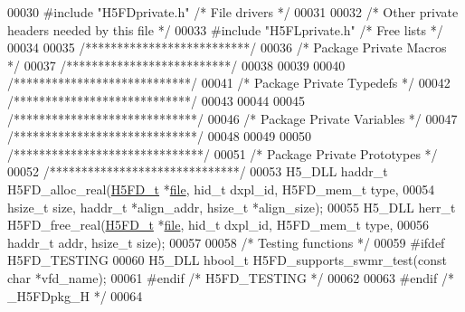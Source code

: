 \begin{DoxyCode}
00030 \textcolor{preprocessor}{#include "H5FDprivate.h"}    \textcolor{comment}{/* File drivers             */}
00031 
00032 \textcolor{comment}{/* Other private headers needed by this file */}
00033 \textcolor{preprocessor}{#include "H5FLprivate.h"}    \textcolor{comment}{/* Free lists                           */}
00034 
00035 \textcolor{comment}{/**************************/}
00036 \textcolor{comment}{/* Package Private Macros */}
00037 \textcolor{comment}{/**************************/}
00038 
00039 
00040 \textcolor{comment}{/****************************/}
00041 \textcolor{comment}{/* Package Private Typedefs */}
00042 \textcolor{comment}{/****************************/}
00043 
00044 
00045 \textcolor{comment}{/*****************************/}
00046 \textcolor{comment}{/* Package Private Variables */}
00047 \textcolor{comment}{/*****************************/}
00048 
00049 
00050 \textcolor{comment}{/******************************/}
00051 \textcolor{comment}{/* Package Private Prototypes */}
00052 \textcolor{comment}{/******************************/}
00053 H5\_DLL haddr\_t H5FD\_alloc\_real(\hyperlink{struct_h5_f_d__t}{H5FD\_t} *\hyperlink{structfile}{file}, hid\_t dxpl\_id, H5FD\_mem\_t type,
00054     hsize\_t size, haddr\_t *align\_addr, hsize\_t *align\_size);
00055 H5\_DLL herr\_t H5FD\_free\_real(\hyperlink{struct_h5_f_d__t}{H5FD\_t} *\hyperlink{structfile}{file}, hid\_t dxpl\_id, H5FD\_mem\_t type,
00056     haddr\_t addr, hsize\_t size);
00057 
00058 \textcolor{comment}{/* Testing functions */}
00059 \textcolor{preprocessor}{#ifdef H5FD\_TESTING}
00060 H5\_DLL hbool\_t H5FD\_supports\_swmr\_test(\textcolor{keyword}{const} \textcolor{keywordtype}{char} *vfd\_name);
00061 \textcolor{preprocessor}{#endif }\textcolor{comment}{/* H5FD\_TESTING */}\textcolor{preprocessor}{}
00062 
00063 \textcolor{preprocessor}{#endif }\textcolor{comment}{/* \_H5FDpkg\_H */}\textcolor{preprocessor}{}
00064 
\end{DoxyCode}
